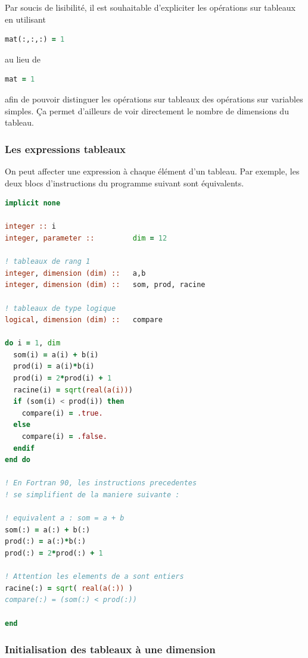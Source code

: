 \documentclass[a4paper,twoside]{article}
\begin{document}
\begin{remarque}
Par soucis de lisibilité, il est souhaitable d'expliciter les opérations sur tableaux en utilisant 
\begin{lstlisting}[language=Fortran]
mat(:,:,:) = 1
\end{lstlisting}
au lieu de 
\begin{lstlisting}[language=Fortran]
mat = 1
\end{lstlisting}
afin de pouvoir distinguer les opérations sur tableaux des opérations sur variables simples. Ça permet d'ailleurs de voir directement le nombre de dimensions du tableau.

\end{remarque}



\subsubsection{Les expressions tableaux}

On peut affecter une expression à chaque élément d'un tableau. Par exemple, les deux blocs d'instructions du programme suivant sont équivalents.

\begin{lstlisting}[language=Fortran]
implicit none 
  
integer :: i
integer, parameter ::         dim = 12

! tableaux de rang 1
integer, dimension (dim) ::   a,b
integer, dimension (dim) ::   som, prod, racine

! tableaux de type logique
logical, dimension (dim) ::   compare

do i = 1, dim 
  som(i) = a(i) + b(i) 
  prod(i) = a(i)*b(i)
  prod(i) = 2*prod(i) + 1 
  racine(i) = sqrt(real(a(i))) 
  if (som(i) < prod(i)) then 
    compare(i) = .true. 
  else 
    compare(i) = .false. 
  endif 
end do 

! En Fortran 90, les instructions precedentes
! se simplifient de la maniere suivante : 
    
! equivalent a : som = a + b
som(:) = a(:) + b(:)
prod(:) = a(:)*b(:)
prod(:) = 2*prod(:) + 1 

! Attention les elements de a sont entiers 
racine(:) = sqrt( real(a(:)) )
compare(:) = (som(:) < prod(:)) 

end
\end{lstlisting}

\subsubsection{Initialisation des tableaux à une dimension}\label{sec:initialisation_tableau}
\end{document}
